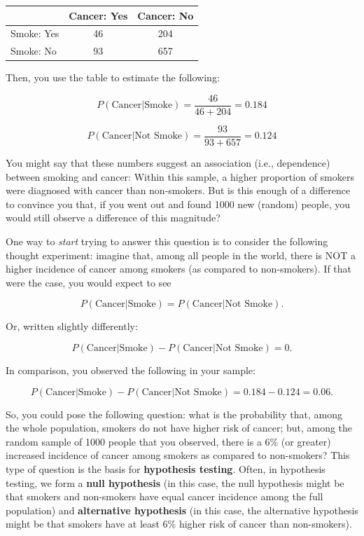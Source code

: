 \documentclass[
  openany]{book}
\begin{document}
\begin{longtable}[]{@{}lcc@{}}
\toprule()
& Cancer: Yes & Cancer: No \\
\midrule()
\endhead
Smoke: Yes & 46 & 204 \\
Smoke: No & 93 & 657 \\
\bottomrule()
\end{longtable}

Then, you use the table to estimate the following:

\[P(\text{Cancer}|\text{Smoke})=\frac{46}{46+204}=0.184\]

\[P(\text{Cancer}|\text{Not Smoke})=\frac{93}{93+657}=0.124\]

You might say that these numbers suggest an association (i.e., dependence) between smoking and cancer: Within this sample, a higher proportion of smokers were diagnosed with cancer than non-smokers. But is this enough of a difference to convince you that, if you went out and found 1000 new (random) people, you would still observe a difference of this magnitude?

One way to \emph{start} trying to answer this question is to consider the following thought experiment: imagine that, among all people in the world, there is NOT a higher incidence of cancer among smokers (as compared to non-smokers). If that were the case, you would expect to see

\[P(\text{Cancer}|\text{Smoke})=P(\text{Cancer}|\text{Not Smoke}).\]

Or, written slightly differently:

\[P(\text{Cancer}|\text{Smoke})-P(\text{Cancer}|\text{Not Smoke})=0.\]

In comparison, you observed the following in your sample:

\[P(\text{Cancer}|\text{Smoke})-P(\text{Cancer}|\text{Not Smoke})=0.184-0.124=0.06.\]

So, you could pose the following question: what is the probability that, among the whole population, smokers do not have higher risk of cancer; but, among the random sample of 1000 people that you observed, there is a 6\% (or greater) increased incidence of cancer among smokers as compared to non-smokers? This type of question is the basis for \textbf{hypothesis testing}. Often, in hypothesis testing, we form a \textbf{null hypothesis} (in this case, the null hypothesis might be that smokers and non-smokers have equal cancer incidence among the full population) and \textbf{alternative hypothesis} (in this case, the alternative hypothesis might be that smokers have at least 6\% higher risk of cancer than non-smokers).
\end{document}
